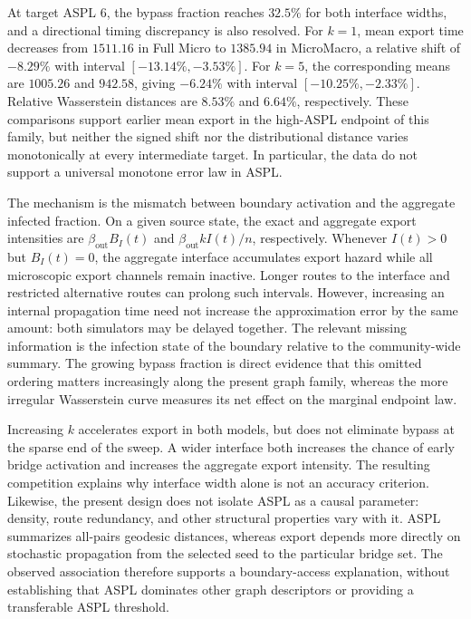 \documentclass[a4paper,fleqn]{cas-sc}
\begin{document}
At target ASPL $6$, the bypass fraction reaches $32.5\%$ for both interface widths, and a directional timing discrepancy is also resolved. For $k=1$, mean export time decreases from $1511.16$ in Full Micro to $1385.94$ in MicroMacro, a relative shift of $-8.29\%$ with interval $[-13.14\%,-3.53\%]$. For $k=5$, the corresponding means are $1005.26$ and $942.58$, giving $-6.24\%$ with interval $[-10.25\%,-2.33\%]$. Relative Wasserstein distances are $8.53\%$ and $6.64\%$, respectively. These comparisons support earlier mean export in the high-ASPL endpoint of this family, but neither the signed shift nor the distributional distance varies monotonically at every intermediate target. In particular, the data do not support a universal monotone error law in ASPL.

The mechanism is the mismatch between boundary activation and the aggregate infected fraction. On a given source state, the exact and aggregate export intensities are $\beta_{\mathrm{out}}B_I(t)$ and $\beta_{\mathrm{out}}kI(t)/n$, respectively. Whenever $I(t)>0$ but $B_I(t)=0$, the aggregate interface accumulates export hazard while all microscopic export channels remain inactive. Longer routes to the interface and restricted alternative routes can prolong such intervals. However, increasing an internal propagation time need not increase the approximation error by the same amount: both simulators may be delayed together. The relevant missing information is the infection state of the boundary relative to the community-wide summary. The growing bypass fraction is direct evidence that this omitted ordering matters increasingly along the present graph family, whereas the more irregular Wasserstein curve measures its net effect on the marginal endpoint law.

Increasing $k$ accelerates export in both models, but does not eliminate bypass at the sparse end of the sweep. A wider interface both increases the chance of early bridge activation and increases the aggregate export intensity. The resulting competition explains why interface width alone is not an accuracy criterion. Likewise, the present design does not isolate ASPL as a causal parameter: density, route redundancy, and other structural properties vary with it. ASPL summarizes all-pairs geodesic distances, whereas export depends more directly on stochastic propagation from the selected seed to the particular bridge set. The observed association therefore supports a boundary-access explanation, without establishing that ASPL dominates other graph descriptors or providing a transferable ASPL threshold.
\end{document}
